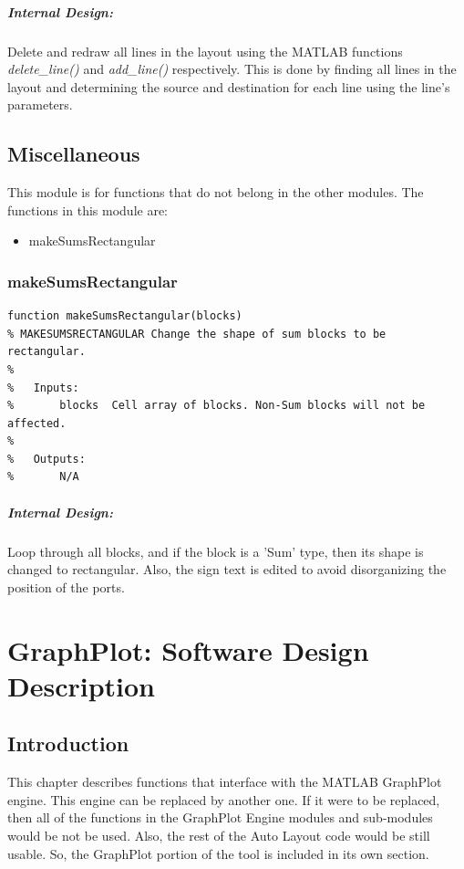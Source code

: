 \documentclass[12pt,letterpaper]{report}
\newcommand{\tool}{Auto Layout\xspace}
\begin{document}
\paragraph{Internal Design:} Delete and redraw all lines in the layout using the MATLAB functions \textit{delete\_line()} and \textit{add\_line()} respectively. This is done by finding all lines in the layout and determining the source and destination for each line using the line's parameters.

\section{Miscellaneous}
\par This module is for functions that do not belong in the other modules. The functions in this module are:
\begin{itemize}
	\item makeSumsRectangular
\end{itemize}

\subsection{makeSumsRectangular}
\begin{lstlisting}
function makeSumsRectangular(blocks)
% MAKESUMSRECTANGULAR Change the shape of sum blocks to be rectangular.
%
%   Inputs:
%       blocks  Cell array of blocks. Non-Sum blocks will not be affected.
%
%   Outputs:
%       N/A
\end{lstlisting}
\paragraph{Internal Design:} Loop through all blocks, and if the block is a 'Sum' type, then its shape is changed to rectangular. Also, the sign text is edited to avoid disorganizing the position of the ports.

\chapter{GraphPlot: Software Design Description} \label{GraphPlotModules}

\section{Introduction}
This chapter describes functions that interface with the MATLAB GraphPlot engine. This engine can be replaced by another one. If it were to be replaced, then all of the functions in the GraphPlot Engine modules and sub-modules would be not be used. Also, the rest of the \tool code would be still usable. So, the GraphPlot portion of the tool is included in its own section.
\end{document}
